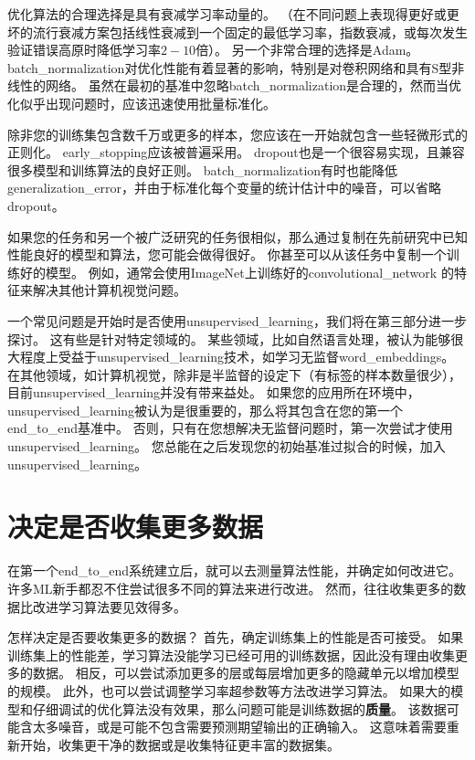 优化算法的合理选择是具有衰减学习率动量的。
（在不同问题上表现得更好或更坏的流行衰减方案包括线性衰减到一个固定的最低学习率，指数衰减，或每次发生验证错误高原时降低学习率$2-10$倍）。
另一个非常合理的选择是Adam。
\gls{batch_normalization}对优化性能有着显著的影响，特别是对卷积网络和具有S型非线性的网络。
虽然在最初的基准中忽略\gls{batch_normalization}是合理的，然而当优化似乎出现问题时，应该迅速使用批量标准化。

除非您的训练集包含数千万或更多的样本，您应该在一开始就包含一些轻微形式的正则化。 
\gls{early_stopping}应该被普遍采用。
\gls{dropout}也是一个很容易实现，且兼容很多模型和训练算法的良好正则。
\gls{batch_normalization}有时也能降低\gls{generalization_error}，并由于标准化每个变量的统计估计中的噪音，可以省略\gls{dropout}。


如果您的任务和另一个被广泛研究的任务很相似，那么通过复制在先前研究中已知性能良好的模型和算法，您可能会做得很好。
你甚至可以从该任务中复制一个训练好的模型。
例如，通常会使用ImageNet上训练好的\gls{convolutional_network} 的特征来解决其他计算机视觉问题\citep{girshickregion}。

一个常见问题是开始时是否使用\gls{unsupervised_learning}，我们将在第三部分进一步探讨。
这有些是针对特定领域的。
某些领域，比如自然语言处理，被认为能够很大程度上受益于\gls{unsupervised_learning}技术，如学习无监督\gls{word_embeddings}。
在其他领域，如计算机视觉，除非是半监督的设定下（有标签的样本数量很少）\citep{Kingma-et-al-NIPS2014,Rasmus-et-al-arxiv2015}，目前\gls{unsupervised_learning}并没有带来益处。
如果您的应用所在环境中，\gls{unsupervised_learning}被认为是很重要的，那么将其包含在您的第一个\gls{end_to_end}基准中。
否则，只有在您想解决无监督问题时，第一次尝试才使用\gls{unsupervised_learning}。
您总能在之后发现您的初始基准过拟合的时候，加入\gls{unsupervised_learning}。

\section{决定是否收集更多数据}
\label{sec:determining_whether_to_gather_more_data}
在第一个\gls{end_to_end}系统建立后，就可以去测量算法性能，并确定如何改进它。
许多\gls{ML}新手都忍不住尝试很多不同的算法来进行改进。
然而，往往收集更多的数据比改进学习算法要见效得多。

怎样决定是否要收集更多的数据？
首先，确定训练集上的性能是否可接受。
如果训练集上的性能差，学习算法没能学习已经可用的训练数据，因此没有理由收集更多的数据。
相反，可以尝试添加更多的层或每层增加更多的隐藏单元以增加模型的规模。
此外，也可以尝试调整学习率超参数等方法改进学习算法。
如果大的模型和仔细调试的优化算法没有效果，那么问题可能是训练数据的\textbf{质量}。
该数据可能含太多噪音，或是可能不包含需要预测期望输出的正确输入。
这意味着需要重新开始，收集更干净的数据或是收集特征更丰富的数据集。

